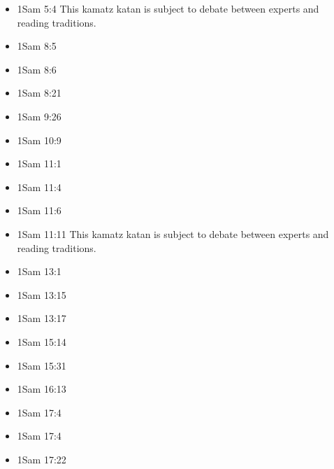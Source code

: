 \documentclass[14pt]{book}
\begin{document}
\begin{multicols}{2}
\begin{itemize}
							\item 1Sam 5:4 This kamatz katan is subject to debate between experts and reading traditions.

							
							\item 1Sam 8:5
							
							\item 1Sam 8:6

							\item 1Sam 8:21
	
							\item 1Sam 9:26
							
							\item 1Sam 10:9
							
							\item 1Sam 11:1
							
							\item 1Sam 11:4
							
							\item 1Sam 11:6
							
							\item 1Sam 11:11 This kamatz katan is subject to debate between experts and reading traditions.
							
							\item 1Sam 13:1
							
							\item 1Sam 13:15
							
							\item 1Sam 13:17
							
							\item 1Sam 15:14
							
							\item 1Sam 15:31
							
							\item 1Sam 16:13
							
							\item 1Sam 17:4
							
							\item 1Sam 17:4
							
							\item 1Sam 17:22
							

\end{itemize}
\end{multicols}
\end{document}
